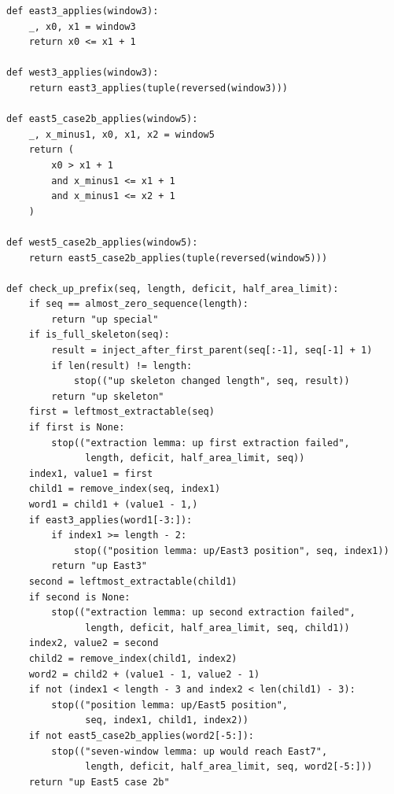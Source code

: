 \documentclass[11pt]{article}
\theoremstyle{plain}
\theoremstyle{definition}
\theoremstyle{remark}
\begin{document}
\begin{lstlisting}
def east3_applies(window3):
    _, x0, x1 = window3
    return x0 <= x1 + 1

def west3_applies(window3):
    return east3_applies(tuple(reversed(window3)))

def east5_case2b_applies(window5):
    _, x_minus1, x0, x1, x2 = window5
    return (
        x0 > x1 + 1
        and x_minus1 <= x1 + 1
        and x_minus1 <= x2 + 1
    )

def west5_case2b_applies(window5):
    return east5_case2b_applies(tuple(reversed(window5)))

def check_up_prefix(seq, length, deficit, half_area_limit):
    if seq == almost_zero_sequence(length):
        return "up special"
    if is_full_skeleton(seq):
        result = inject_after_first_parent(seq[:-1], seq[-1] + 1)
        if len(result) != length:
            stop(("up skeleton changed length", seq, result))
        return "up skeleton"
    first = leftmost_extractable(seq)
    if first is None:
        stop(("extraction lemma: up first extraction failed",
              length, deficit, half_area_limit, seq))
    index1, value1 = first
    child1 = remove_index(seq, index1)
    word1 = child1 + (value1 - 1,)
    if east3_applies(word1[-3:]):
        if index1 >= length - 2:
            stop(("position lemma: up/East3 position", seq, index1))
        return "up East3"
    second = leftmost_extractable(child1)
    if second is None:
        stop(("extraction lemma: up second extraction failed",
              length, deficit, half_area_limit, seq, child1))
    index2, value2 = second
    child2 = remove_index(child1, index2)
    word2 = child2 + (value1 - 1, value2 - 1)
    if not (index1 < length - 3 and index2 < len(child1) - 3):
        stop(("position lemma: up/East5 position",
              seq, index1, child1, index2))
    if not east5_case2b_applies(word2[-5:]):
        stop(("seven-window lemma: up would reach East7",
              length, deficit, half_area_limit, seq, word2[-5:]))
    return "up East5 case 2b"


\end{lstlisting}
\end{document}
